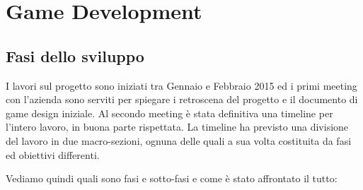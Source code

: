 \chapter{Game Development}
\label{chap:game_development}

\section{Fasi dello sviluppo}
\label{sec:dev_fasi_sviluppo}

I lavori sul progetto  sono iniziati tra Gennaio e Febbraio 2015 ed i primi meeting con l'azienda sono serviti per spiegare i retroscena del progetto e il documento di game design iniziale.
Al secondo meeting è stata definitiva una timeline per l'intero lavoro, in buona parte rispettata. La timeline ha previsto una divisione del lavoro in due macro-sezioni, ognuna delle quali a sua volta costituita da fasi ed obiettivi differenti.

Vediamo quindi quali sono fasi e sotto-fasi e come è stato affrontato il tutto:

